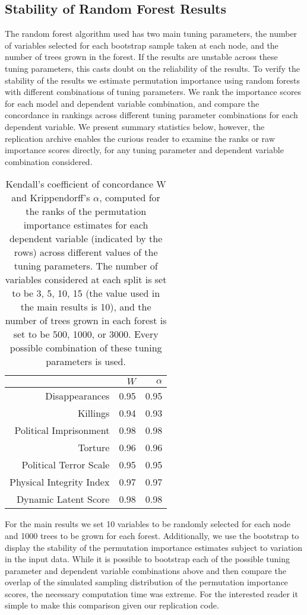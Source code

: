\documentclass[11pt]{article}
\begin{document}
\subsection{Stability of Random Forest Results}

The random forest algorithm used has two main tuning parameters, the number of variables selected for each bootstrap sample taken at each node, and the number of trees grown in the forest. If the results are unstable across these tuning parameters, this casts doubt on the reliability of the results. To verify the stability of the results we estimate permutation importance using random forests with different combinations of tuning parameters. We rank the importance scores for each model and dependent variable combination, and compare the concordance in rankings across different tuning parameter combinations for each dependent variable. We present summary statistics below, however, the replication archive enables the curious reader to examine the ranks or raw importance scores directly, for any tuning parameter and dependent variable combination considered.

\begin{table}[ht]
\centering
\begin{tabular}{rrr}
  \hline
 & $W$ & $\alpha$ \\ 
  \hline
Disappearances & 0.95 & 0.95 \\ 
  Killings & 0.94 & 0.93 \\ 
  Political Imprisonment & 0.98 & 0.98 \\ 
  Torture & 0.96 & 0.96 \\ 
  Political Terror Scale & 0.95 & 0.95 \\ 
  Physical Integrity Index & 0.97 & 0.97 \\ 
  Dynamic Latent Score & 0.98 & 0.98 \\ 
   \hline
\end{tabular}
\caption{Kendall's coefficient of concordance W and Krippendorff's $\alpha$, computed for the ranks of the permutation importance estimates for each dependent variable (indicated by the rows) across different values of the tuning parameters. The number of variables considered at each split is set to be 3, 5, 10, 15 (the value used in the main results is 10), and the number of trees grown in each forest is set to be 500, 1000, or 3000. Every possible combination of these tuning parameters is used.}
\end{table}

For the main results we set 10 variables to be randomly selected for each node and 1000 trees to be grown for each forest. Additionally, we use the bootstrap to display the stability of the permutation importance estimates subject to variation in the input data. While it is possible to bootstrap each of the possible tuning parameter and dependent variable combinations above and then compare the overlap of the simulated sampling distribution of the permutation importance scores, the necessary computation time was extreme. For the interested reader it simple to make this comparison given our replication code.
\end{document}
